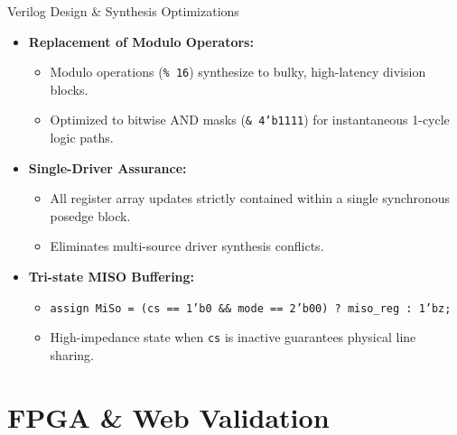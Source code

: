\documentclass{beamer}
\begin{document}
\begin{frame}{Verilog Design \& Synthesis Optimizations}
  \begin{itemize}
    \item \textbf{Replacement of Modulo Operators:}
    \begin{itemize}
      \item Modulo operations (\texttt{\% 16}) synthesize to bulky, high-latency division blocks.
      \item Optimized to bitwise AND masks (\texttt{\& 4'b1111}) for instantaneous 1-cycle logic paths.
    \end{itemize}
    \vspace{0.15cm}
    \item \textbf{Single-Driver Assurance:}
    \begin{itemize}
      \item All register array updates strictly contained within a single synchronous posedge block.
      \item Eliminates multi-source driver synthesis conflicts.
    \end{itemize}
    \vspace{0.15cm}
    \item \textbf{Tri-state MISO Buffering:}
    \begin{itemize}
      \item \texttt{assign MiSo = (cs == 1'b0 \&\& mode == 2'b00) ? miso\_reg : 1'bz;}
      \item High-impedance state when \texttt{cs} is inactive guarantees physical line sharing.
    \end{itemize}
  \end{itemize}
\end{frame}

\section{FPGA \& Web Validation}
\end{document}
